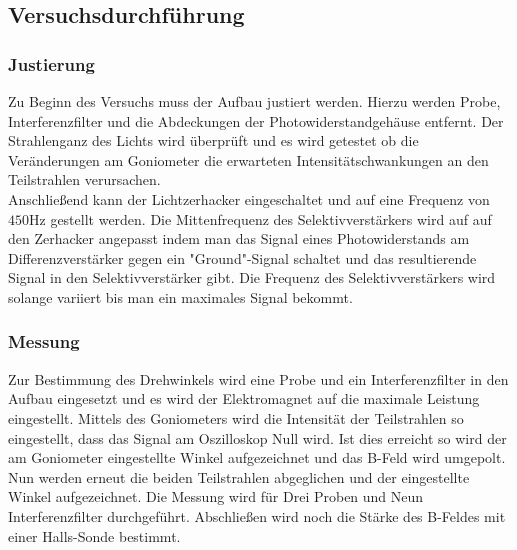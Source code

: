 \subsection{Versuchsdurchführung}
\subsubsection{Justierung}
Zu Beginn des Versuchs muss der Aufbau justiert werden. Hierzu werden Probe, Interferenzfilter und die Abdeckungen der Photowiderstandgehäuse entfernt. Der Strahlenganz des Lichts wird überprüft und es wird getestet ob die Veränderungen am Goniometer die erwarteten Intensitätschwankungen an den Teilstrahlen verursachen.\\
Anschließend kann der Lichtzerhacker eingeschaltet und auf eine Frequenz von $450\si{\Hz}$ gestellt werden. Die Mittenfrequenz des Selektivverstärkers wird auf auf den Zerhacker angepasst indem man das Signal eines Photowiderstands am Differenzverstärker gegen ein "Ground"-Signal schaltet und das resultierende Signal in den Selektivverstärker gibt. Die Frequenz des Selektivverstärkers wird solange variiert bis man ein maximales Signal bekommt.
\subsubsection{Messung}
Zur Bestimmung des Drehwinkels wird eine Probe und ein Interferenzfilter in den Aufbau eingesetzt und es wird der Elektromagnet auf die maximale Leistung eingestellt. Mittels des Goniometers wird die Intensität der Teilstrahlen so eingestellt, dass das Signal am Oszilloskop Null wird. Ist dies erreicht so wird der am Goniometer eingestellte Winkel aufgezeichnet und das B-Feld wird umgepolt. Nun werden erneut die beiden Teilstrahlen abgeglichen und der eingestellte Winkel aufgezeichnet. Die Messung wird für Drei Proben und Neun Interferenzfilter durchgeführt. Abschließen wird noch die Stärke des B-Feldes mit einer Halls-Sonde bestimmt. 
